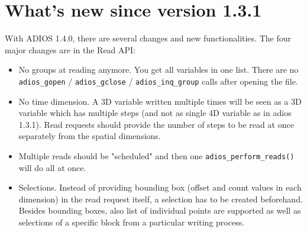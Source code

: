 %
%
%
%
%

\section {What's new since version 1.3.1}

With ADIOS 1.4.0, there are several changes and new functionalities. 
The four major changes are in the Read API:

\begin{itemize}
\item No groups at reading anymore. You get all variables in one list.
There are no \verb+adios_gopen+ / \verb+adios_gclose+ / \verb+adios_inq_group+ 
calls after opening the file.
\item No time dimension. A 3D variable written multiple times will be seen as 
a 3D variable which has multiple steps (and not as single 4D variable as in adios 1.3.1).
Read requests should provide the number of steps to be read at once separately from the
spatial dimensions.
\item Multiple reads should be "scheduled" and then one \verb+adios_perform_reads()+ 
will do all at once. 
\item Selections. Instead of providing bounding box (offset and count values
in each dimension) in the read request itself, a selection has to be created 
beforehand. Besides bounding boxes, also list of individual points are supported 
as well as selections of a specific block from a particular writing process.
\end{itemize}


